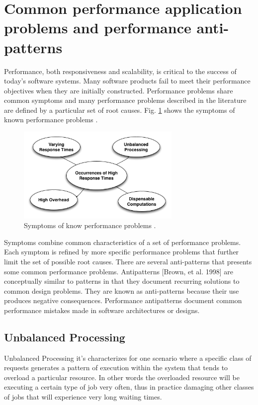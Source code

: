 \documentclass[review]{elsarticle}
\begin{document}
\section{Common performance application problems and performance anti-patterns}

Performance, both responsiveness and scalability, is critical to the success of today’s software systems. Many software products fail to meet their performance objectives when they are initially constructed. Performance problems share common symptoms and many performance problems described in the literature are defined by a particular set of root causes. Fig. \ref{fig:symptoms}  shows the symptoms of known performance problems \cite{Wert2013a}. 



\begin{figure}[h]
\centering
\includegraphics[width=0.7\textwidth]{./images/symptoms.png}
\caption{Symptoms of know performance problems \cite{Wert2013a}. }
\label{fig:symptoms}
\end{figure}


Symptoms combine common characteristics of a set of performance problems. Each symptom is refined by more specific performance problems that further limit the set of possible root causes. There are several anti-patterns that presents some common performance problems. Antipatterns [Brown, et al. 1998] are conceptually similar to patterns in that they document recurring solutions to common design problems. They are known as
anti-patterns because their use produces negative consequences.  Performance antipatterns document common performance mistakes made in software architectures or designs.


\subsection{Unbalanced Processing} 

Unbalanced Processing it's characterizes for one scenario where a specific class of requests generates a pattern of execution within the system that tends to overload a particular resource. In other words the overloaded resource will be executing a certain type of job very often, thus in practice damaging other classes
of jobs that will experience very long waiting times.
\end{document}
